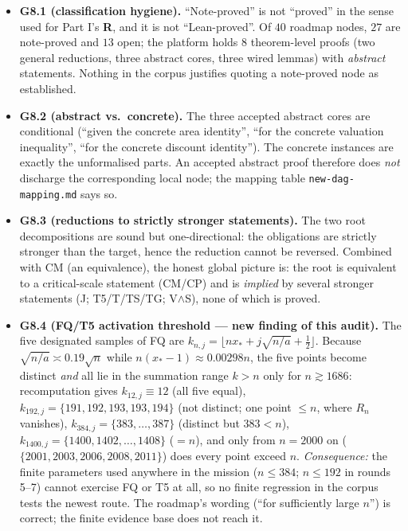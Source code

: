 \documentclass[11pt]{article}
\newcommand{\stR}{\textcolor{okgreen}{\textbf{R}}}
\begin{document}
\begin{itemize}[leftmargin=1.4em]
\item \textbf{G8.1 (classification hygiene).} ``Note-proved'' is not ``proved'' in the sense used for
      Part I's \stR, and it is not ``Lean-proved''. Of $40$ roadmap nodes, $27$ are note-proved and
      $13$ open; the platform holds $8$ theorem-level proofs (two general reductions, three abstract
      cores, three wired lemmas) with \emph{abstract} statements. Nothing in the corpus justifies
      quoting a note-proved node as established.
\item \textbf{G8.2 (abstract vs.\ concrete).} The three accepted abstract cores are conditional
      (``given the concrete area identity'', ``for the concrete valuation inequality'', ``for the
      concrete discount identity''). The concrete instances are exactly the unformalised parts. An
      accepted abstract proof therefore does \emph{not} discharge the corresponding local node; the
      mapping table \texttt{new-dag-mapping.md} says so.
\item \textbf{G8.3 (reductions to strictly stronger statements).} The two root decompositions are
      sound but one-directional: the obligations are strictly stronger than the target, hence the
      reduction cannot be reversed. Combined with CM (an equivalence), the honest global picture is:
      the root is equivalent to a critical-scale statement (CM/CP) and is \emph{implied} by several
      stronger statements (J; T5/T/TS/TG; V$\wedge$S), none of which is proved.
\item \textbf{G8.4 (FQ/T5 activation threshold --- new finding of this audit).} The five designated
      samples of FQ are $k_{n,j}=\lfloor nx_*+j\sqrt{n/a}+\frac12\rfloor$. Because
      $\sqrt{n/a}\asymp0.19\sqrt{n}$ while $n(x_*-1)\approx0.00298n$, the five points become distinct
      \emph{and} all lie in the summation range $k>n$ only for $n\gtrsim1686$: recomputation gives
      $k_{12,j}\equiv12$ (all five equal), $k_{192,j}=\{191,192,193,193,194\}$ (not distinct; one
      point $\le n$, where $R_n$ vanishes), $k_{384,j}=\{383,\dots,387\}$ (distinct but $383<n$),
      $k_{1400,j}=\{1400,1402,\dots,1408\}$ ($=n$), and only from $n=2000$ on
      ($\{2001,2003,2006,2008,2011\}$) does every point exceed $n$. \emph{Consequence:} the finite
      parameters used anywhere in the mission ($n\le384$; $n\le192$ in rounds 5--7) cannot exercise
      FQ or T5 at all, so no finite regression in the corpus tests the newest route. The roadmap's
      wording (``for sufficiently large $n$'') is correct; the finite evidence base does not reach it.

\end{itemize}
\end{document}

